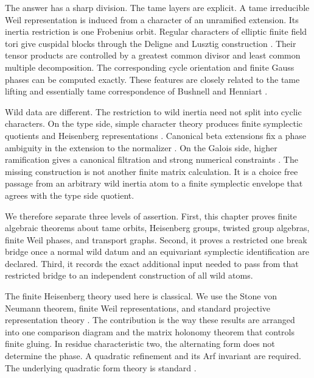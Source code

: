 \documentclass[11pt]{amsart}
\theoremstyle{definition}
\theoremstyle{remark}
\begin{document}
The answer has a sharp division. The tame layers are explicit. A tame irreducible Weil representation is induced from a character of an unramified extension. Its inertia restriction is one Frobenius orbit. Regular characters of elliptic finite field tori give cuspidal blocks through the Deligne and Lusztig construction \cite{DeligneLusztig1976}. Their tensor products are controlled by a greatest common divisor and least common multiple decomposition. The corresponding cycle orientation and finite Gauss phases can be computed exactly. These features are closely related to the tame lifting and essentially tame correspondence of Bushnell and Henniart \cite{BushnellHenniart1996,BushnellHenniart1999,BushnellHenniart2005ET1,BushnellHenniart2005ET2,BushnellHenniart2010ET3}.

Wild data are different. The restriction to wild inertia need not split into cyclic characters. On the type side, simple character theory produces finite symplectic quotients and Heisenberg representations \cite{BushnellKutzko1993}. Canonical beta extensions fix a phase ambiguity in the extension to the normalizer \cite{Blondel2012,Dotto2022}. On the Galois side, higher ramification gives a canonical filtration and strong numerical constraints \cite{BushnellHenniart2017}. The missing construction is not another finite matrix calculation. It is a choice free passage from an arbitrary wild inertia atom to a finite symplectic envelope that agrees with the type side quotient.

We therefore separate three levels of assertion. First, this chapter proves finite algebraic theorems about tame orbits, Heisenberg groups, twisted group algebras, finite Weil phases, and transport graphs. Second, it proves a restricted one break bridge once a normal wild datum and an equivariant symplectic identification are declared. Third, it records the exact additional input needed to pass from that restricted bridge to an independent construction of all wild atoms.

The finite Heisenberg theory used here is classical. We use the Stone von Neumann theorem, finite Weil representations, and standard projective representation theory \cite{Gerardin1977,Neuhauser2002,Prasad2009,Karpilovsky1985,GurevichHadani2007}. The contribution is the way these results are arranged into one comparison diagram and the matrix holonomy theorem that controls finite gluing. In residue characteristic two, the alternating form does not determine the phase. A quadratic refinement and its Arf invariant are required. The underlying quadratic form theory is standard \cite{MilnorHusemoller1973}.
\end{document}
